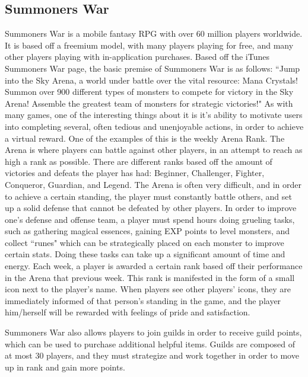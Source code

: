 \subsection{Summoners War}
Summoners War is a mobile fantasy RPG with over 60 million players worldwide. It is based off a freemium model, with many players playing for free, and many other players playing with in-application purchases. Based off the iTunes Summoners War page, the basic premise of Summoners War is as follows: ``Jump into the Sky Arena, a world under battle over the vital resource: Mana Crystals! Summon over 900 different types of monsters to compete for victory in the Sky Arena! Assemble the greatest team of monsters for strategic victories!"
	As with many games, one of the interesting things about it is it's ability to motivate users into completing several, often tedious and unenjoyable actions, in order to achieve a virtual reward. One of the examples of this is the weekly Arena Rank. The Arena is where players can battle against other players, in an attempt to reach as high a rank as possible. There are different ranks based off the amount of victories and defeats the player has had: Beginner, Challenger, Fighter, Conqueror, Guardian, and Legend. The Arena is often very difficult, and in order to achieve a certain standing, the player must constantly battle others, and set up a solid defense that cannot be defeated by other players. In order to improve one's defense and offense team, a player must spend hours doing grueling tasks, such as gathering magical essences, gaining EXP points to level monsters, and collect ``runes" which can be strategically placed on each monster to improve certain stats. Doing these tasks can take up a significant amount of time and energy. Each week, a player is awarded a certain rank based off their performance in the Arena that previous week. This rank is manifested in the form of a small icon next to the player's name. When players see other players' icons, they are immediately informed of that person's standing in the game, and the player him/herself will be rewarded with feelings of pride and satisfaction.
	
Summoners War also allows players to join guilds in order to receive guild points, which can be used to purchase additional helpful items. Guilds are composed of at most 30 players, and they must strategize and work together in order to move up in rank and gain more points. 

